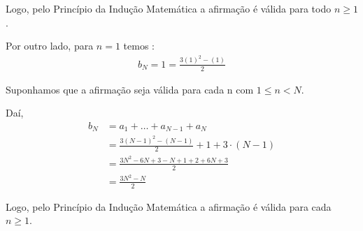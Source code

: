 Logo, pelo Princípio da Indução Matemática a afirmação é válida para todo $n \ge 1$.

Por outro lado, para $n = 1$ temos : 
\begin{align*}
    b_{N} = 1 = \frac{3(1)^2 - (1)}{2}
\end{align*}

Suponhamos que a afirmação seja válida para cada n com $1 \leq n < N$.

Daí,
\begin{align*}
    b_{N} &= a_1 + \dotsc + a_{N-1} + a_{N} \\
    &= \frac{3(N-1)^2 - (N-1)}{2} + 1 + 3 \cdot (N - 1) \\
    &= \frac{ 3N^{2} -6N + 3 -N + 1 + 2 + 6N + 3 }{2} \\
    &= \frac{3N^{2} - N}{2}
\end{align*}

Logo, pelo Princípio da Indução Matemática a afirmação é válida para cada $n \ge 1$.

